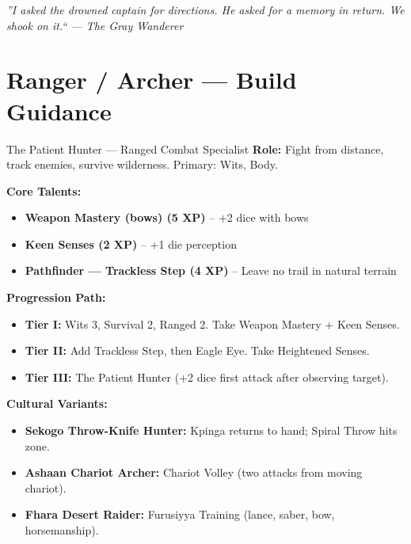 \documentclass[10pt]{article}
\begin{document}
\vspace{0.5em}
\begin{center}
    {\small\sffamily\itshape ''I asked the drowned captain for directions. He asked for a memory in return. We shook on it.`` --- The Gray Wanderer}
\end{center}

\newpage


\section*{Ranger / Archer --- Build Guidance}

\begin{tipbox}{The Patient Hunter --- Ranged Combat Specialist}
    \textbf{Role:} Fight from distance, track enemies, survive wilderness. Primary: Wits, Body.
    
    \textbf{Core Talents:}
    \begin{itemize}
        \item \textbf{Weapon Mastery (bows) (5 XP)} -- +2 dice with bows
        \item \textbf{Keen Senses (2 XP)} -- +1 die perception
        \item \textbf{Pathfinder --- Trackless Step (4 XP)} -- Leave no trail in natural terrain
    \end{itemize}
    
    \textbf{Progression Path:}
    \begin{itemize}
        \item \textbf{Tier I:} Wits 3, Survival 2, Ranged 2. Take Weapon Mastery + Keen Senses.
        \item \textbf{Tier II:} Add Trackless Step, then Eagle Eye. Take Heightened Senses.
        \item \textbf{Tier III:} The Patient Hunter (+2 dice first attack after observing target).
    \end{itemize}
    
    \textbf{Cultural Variants:}
    \begin{itemize}
        \item \textbf{Sekogo Throw-Knife Hunter:} Kpinga returns to hand; Spiral Throw hits zone.
        \item \textbf{Ashaan Chariot Archer:} Chariot Volley (two attacks from moving chariot).
        \item \textbf{Fhara Desert Raider:} Furusiyya Training (lance, saber, bow, horsemanship).
    \end{itemize}
\end{tipbox}
\end{document}
